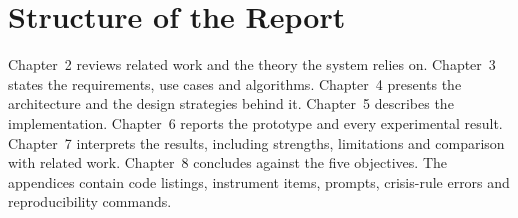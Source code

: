 \section{Structure of the Report}
Chapter~2 reviews related work and the theory the system relies on. Chapter~3 states the requirements, use cases and algorithms. Chapter~4 presents the architecture and the design strategies behind it. Chapter~5 describes the implementation. Chapter~6 reports the prototype and every experimental result. Chapter~7 interprets the results, including strengths, limitations and comparison with related work. Chapter~8 concludes against the five objectives. The appendices contain code listings, instrument items, prompts, crisis-rule errors and reproducibility commands.
